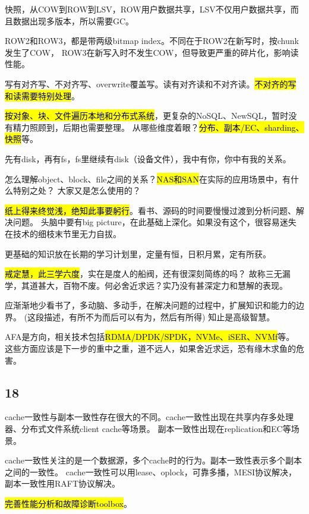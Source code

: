 \hrulefill

快照，从COW到ROW到LSV，ROW用户数据共享，LSV不仅用户数据共享，而且数据出现多版本，所以需要GC。

ROW2和ROW3，都是带两级bitmap index。不同在于ROW2在新写时，按chunk发生了COW，
ROW3在新写入时不发生COW，但导致更严重的碎片化，影响读性能。

写有对齐写、不对齐写、overwrite覆盖写。读有对齐读和不对齐读。\hl{不对齐的写和读需要特别处理}。

\hrulefill

\hl{按对象、块、文件遍历本地和分布式系统}，更复杂的NoSQL、NewSQL，暂时没有精力照顾到，后期也需要整理。
从哪些维度着眼？\hl{分布、副本/EC、sharding、快照}等。

先有disk，再有fs，fs里继续有disk（设备文件），我中有你，你中有我的关系。

怎么理解object、block、file之间的关系？\hl{NAS和SAN}在实际的应用场景中，有什么特别之处？
大家又是怎么使用的？

\hrulefill

\hl{纸上得来终觉浅，绝知此事要躬行}。看书、源码的时间要慢慢过渡到分析问题、解决问题。
头脑中要有big picture，在此基础上深化。如果没有这个，很容易迷失在技术的细枝末节里无力自拔。

更基础的知识放在长期的学习计划里，定量有恒，日积月累，定有所获。

\hl{戒定慧，此三学六度}，实在是度人的船阀，还有很深刻简练的吗？
故称三无漏学，其道甚大，百物不废。何必舍近求远？实乃没有甚深定力和慧解的表现。

应渐渐地少看书了，多动脑、多动手，在解决问题的过程中，扩展知识和能力的边界。
(这段描述，有所不为而后可以有为，然后有所得) 知止是高级智慧。

AFA是方向，相关技术包括\hl{RDMA/DPDK/SPDK，NVMe、iSER、NVMf}等。
这些方面应该是下一步的重中之重，道不远人，如果舍近求远，恐有缘木求鱼的危害。

\subsection{18}

cache一致性与副本一致性存在很大的不同。cache一致性出现在共享内存多处理器、分布式文件系统client cache等场景。
副本一致性出现在replication和EC等场景。

cache一致性关注的是一个数据源，多个cache时的行为。副本一致性表示多个副本之间的一致性。
cache一致性可以用lease、oplock，可靠多播，MESI协议解决，副本一致性用RAFT协议解决。

\hl{完善性能分析和故障诊断toolbox}。

